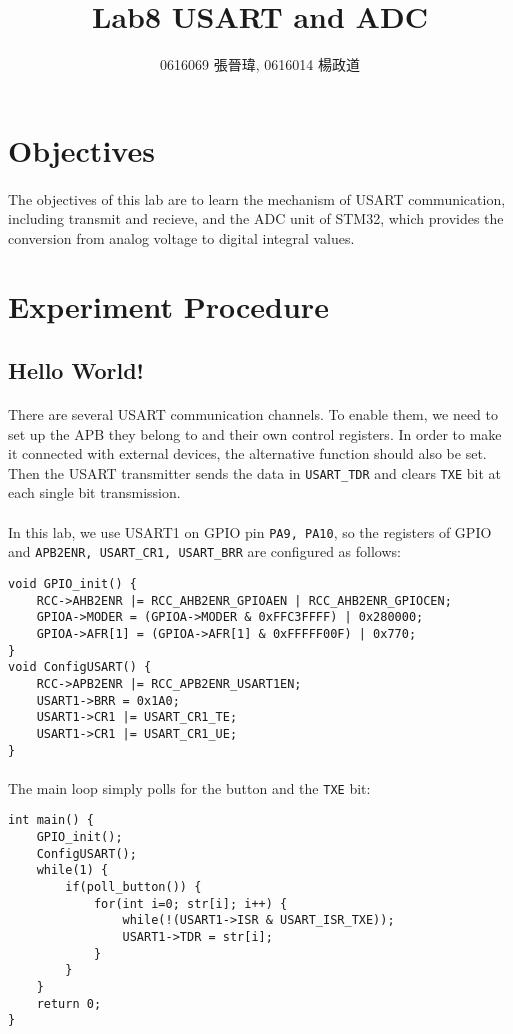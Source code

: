 \title{Lab8 USART and ADC}
\author{0616069 張晉瑋, 0616014 楊政道}
\maketitle
\thispagestyle{fancy}
\section{Objectives}
\paragraph{}
The objectives of this lab are to learn the mechanism of USART communication, including transmit and recieve,
and the ADC unit of STM32, which provides the conversion from analog voltage to digital integral values.
\section{Experiment Procedure}
\subsection{Hello World!}
\paragraph{}
There are several USART communication channels.
To enable them, we need to set up the APB they belong to and their own control registers.
In order to make it connected with external devices, the alternative function should also be set.
Then the USART transmitter sends the data in \texttt{USART\_TDR} and clears \texttt{TXE} bit at each single bit transmission.
\paragraph{}
In this lab, we use USART1 on GPIO pin \texttt{PA9, PA10},
so the registers of GPIO and \texttt{APB2ENR, USART\_CR1, USART\_BRR} are configured as follows:
\begin{lstlisting}
void GPIO_init() {
	RCC->AHB2ENR |= RCC_AHB2ENR_GPIOAEN | RCC_AHB2ENR_GPIOCEN;
	GPIOA->MODER = (GPIOA->MODER & 0xFFC3FFFF) | 0x280000;
	GPIOA->AFR[1] = (GPIOA->AFR[1] & 0xFFFFF00F) | 0x770;
}
void ConfigUSART() {
	RCC->APB2ENR |= RCC_APB2ENR_USART1EN;
	USART1->BRR = 0x1A0;
	USART1->CR1 |= USART_CR1_TE;
	USART1->CR1 |= USART_CR1_UE;
}
\end{lstlisting}
\paragraph{}
The main loop simply polls for the button and the \texttt{TXE} bit:
\begin{lstlisting}
int main() {
	GPIO_init();
	ConfigUSART();
	while(1) {
		if(poll_button()) {
			for(int i=0; str[i]; i++) {
				while(!(USART1->ISR & USART_ISR_TXE));
				USART1->TDR = str[i];
			}
		}
	}
	return 0;
}
\end{lstlisting}


